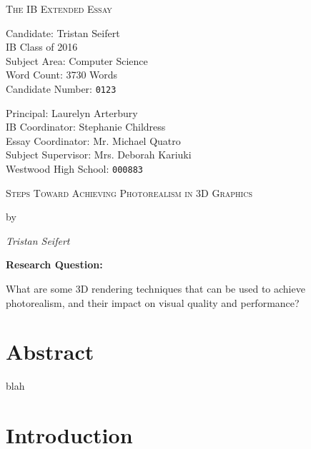 \documentclass[11pt, oneside]{report}
\begin{document}
\begin{titlepage}
	{\centering\scshape\Huge The IB Extended Essay\par}
	\vspace{.66cm}
	
	\begin{minipage}[t]{0.48\textwidth}
		Candidate: Tristan Seifert \\
		IB Class of 2016 \\
		Subject Area: Computer Science \\
		Word Count: 3730 Words \\
		Candidate Number: \tt{0123}
	\end{minipage}
	\hfill
	\begin{minipage}[t]{0.48\textwidth}
		\begin{flushright}
			Principal: Laurelyn Arterbury \\
			IB Coordinator: Stephanie Childress \\
			Essay Coordinator: Mr. Michael Quatro \\
			Subject Supervisor: Mrs. Deborah Kariuki \\
			Westwood High School: \tt{000883}
		\end{flushright}
	\end{minipage}

	\centering
	\vspace{7.4cm}
	{\scshape\Large Steps Toward Achieving Photorealism in 3D Graphics\par}
	{by\par}
	{\itshape Tristan Seifert\par}
	\vspace{7.4cm}
	{\bfseries Research Question:}
	{What are some 3D rendering techniques that can be used to achieve photorealism, and their impact on visual quality and performance?\par}
	\vfill
\end{titlepage}

{
	\renewcommand{\addtocontents}[2]{}
	\chapter*{Abstract}
}
blah

\tableofcontents

\chapter{Introduction}
\end{document}
